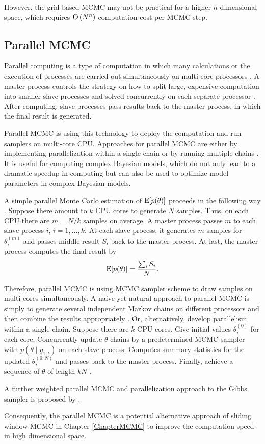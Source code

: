 However, the grid-based MCMC may not be practical for a higher $n$-dimensional space, which requires ${\rm O}\left(N^n\right)$ computation cost per MCMC step. 


\subsection*{Parallel MCMC}

Parallel computing is a type of computation in which many calculations or the execution of processes are carried out simultaneously on multi-core processors \cite{asanovic2006landscape}. A master process controls the strategy on how to split large, expensive computation into smaller slave processes and solved concurrently on each separate processor \cite{Almasi1994Highly}. After computing, slave processes pass results back to the master process, in which the final result is generated. 

Parallel MCMC is using this technology to deploy the computation and run samplers on multi-core CPU. Approaches for parallel MCMC are either by implementing parallelization within a single chain or by running multiple chains \cite{wu2012parallel}. It is useful for computing complex Bayesian models, which do not only lead to a dramatic speedup in computing but can also be used to optimize model parameters in complex Bayesian models.

A simple parallel Monte Carlo estimation of $\mathrm{E}\lbrack p(\theta)\rbrack$ proceeds in the following way \cite{kontoghiorghes2005handbook}. Suppose there amount to $k$ CPU cores to generate $N$ samples. Thus, on each CPU there are $m=N/k$ samples on average. A master process passes $m$ to each slave process $i$, $i=1,\ldots,k$. At each slave process, it generates $m$ samples for $\theta_i^{(m)}$ and passes middle-result $S_i$ back to the master process. At last, the master process computes the final result by 
\begin{equation*}
\mathrm{E}\lbrack p(\theta)\rbrack=\frac{\sum_i S_i}{N}. 
\end{equation*}

Therefore, parallel MCMC is using MCMC sampler scheme to draw samples on multi-cores simultaneously. A naive yet natural approach to parallel MCMC is simply to generate several independent Markov chains on different
processors and then combine the results appropriately \cite{bradford1996markov} \cite{gelman1992inference}. Or, alternatively, develop parallelism within a single chain. Suppose there are $k$ CPU cores. Give initial values $\theta_i^{(0)}$ for each core. Concurrently update $\theta$ chains by a predetermined MCMC sampler with $p(\theta\mid y_{1:t})$ on each slave process. Computes summary statistics for the updated $\theta_i^{(0: N)}$ and passes back to the master process. Finally, achieve a sequence of $\theta$ of length $kN$ \cite{wu2012parallel}. 

A further weighted parallel MCMC and parallelization approach to the Gibbs sampler is proposed by \cite{vanderwerken2013parallel}.

Consequently, the parallel MCMC is a potential alternative approach of sliding window MCMC in Chapter \ref{ChapterMCMC} to improve the computation speed in high dimensional space. 


